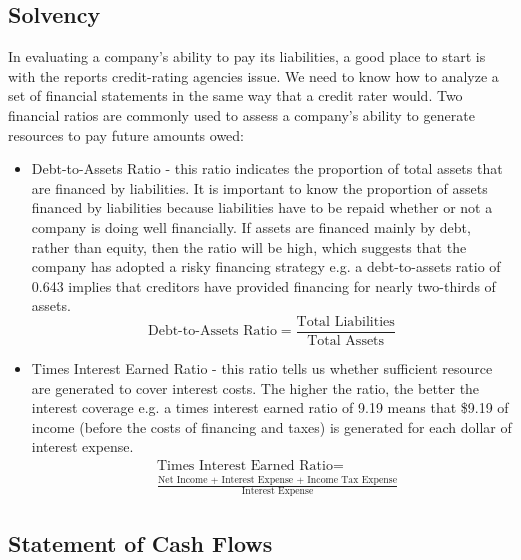 \documentclass[../main.tex]{subfiles}
\begin{document}
	
	\subsection{Solvency}
	
	In evaluating a company's ability to pay its liabilities, a good place to 
	start is with the reports credit-rating agencies issue. We need to know how 
	to analyze a set of financial statements in the same way that a credit 
	rater would. Two financial ratios are commonly 
	used to assess a company's ability to generate resources to pay future 
	amounts owed:
	\begin{itemize}
		\item Debt-to-Assets Ratio - this ratio indicates the proportion of 
		total assets that are financed by liabilities. It is important to know 
		the proportion of assets financed by liabilities because liabilities 
		have to be repaid whether or not a company is doing well financially. 
		If assets are financed mainly by debt, rather than equity, then the 
		ratio will be high, which suggests that the company has adopted a risky 
		financing strategy e.g. a debt-to-assets ratio of 0.643 implies that 
		creditors have provided financing for nearly two-thirds of assets. 
		\begin{equation}
		\text{Debt-to-Assets Ratio} = \frac{\text{Total 
				Liabilities}}{\text{Total Assets}}
		\end{equation} 
		\item Times Interest Earned Ratio - this ratio tells us whether 
		sufficient resource are generated to cover interest costs. The higher 
		the ratio, the better the interest coverage e.g. a times interest 
		earned ratio of 9.19 means that \$9.19 of income (before the costs of 
		financing and taxes) is generated for each dollar of interest expense. 
		\begin{equation}
		\begin{aligned}
		&\text{Times Interest Earned Ratio} =\\ &\frac{\text{Net Income + 
				Interest Expense + Income Tax Expense}}{\text{Interest Expense}}
		\end{aligned}
		\end{equation}
	\end{itemize}
	
	\subsection{Statement of Cash Flows}
	
\end{document}

